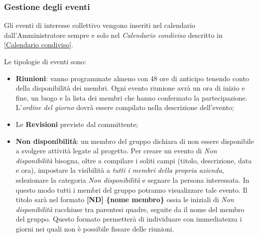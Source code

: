 	\subsubsection{Gestione degli eventi}
	
	Gli eventi di interesse collettivo vengono inseriti nel calendario dall'Amministratore sempre e solo nel \emph{Calendario condiviso} descritto in \ref{Calendario condiviso}.
	
	Le tipologie di eventi sono:
	\begin{itemize}
		\item \textbf{Riunioni}: vanno programmate almeno con 48 ore di anticipo tenendo conto della disponibilità dei membri. Ogni evento riunione avrà un ora di inizio e fine, un luogo e la lista dei membri che hanno confermato la partecipazione. L'\emph{ordine del giorno} dovrà essere compilato nella descrizione dell'evento;
		\item Le \textbf{Revisioni} previste dal committente;
		\item \textbf{Non disponibilità}: un membro del gruppo dichiara di non essere disponibile a svolgere attività legate al progetto. Per creare un evento di \emph{Non disponibilità} bisogna, oltre a compilare i soliti campi (titolo, descrizione, data e ora), impostare la visibilità a \emph{tutti i membri della propria azienda}, selezionare la categoria \emph{Non disponibilità} e segnare la persona interessata. In questo modo tutti i membri del gruppo \GroupName{} potranno visualizzare tale evento. 
		Il titolo sarà nel formato \textbf{[ND] \{nome membro\}} ossia le iniziali di \emph{Non disponibilità} racchiuse tra parentesi quadre, seguite da il nome del membro del gruppo. Questo formato permetterà di individuare con immediatezza i giorni nei quali non è possibile fissare delle riunioni.
	\end{itemize}